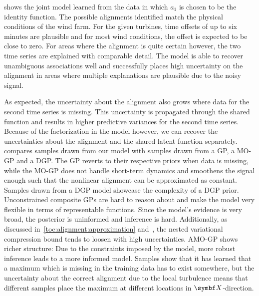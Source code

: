  shows the joint model learned from the data in which $a_1$ is chosen to be the identity function.
The possible alignments identified match the physical conditions of the wind farm.
For the given turbines, time offsets of up to six minutes are plausible and for most wind conditions, the offset is expected to be close to zero.
For areas where the alignment is quite certain however, the two time series are explained with comparable detail.
The model is able to recover unambiguous associations well and successfully places high uncertainty on the alignment in areas where multiple explanations are plausible due to the noisy signal.

As expected, the uncertainty about the alignment also grows where data for the second time series is missing.
This uncertainty is propagated through the shared function and results in higher predictive variances for the second time series.
Because of the factorization in the model however, we can recover the uncertainties about the alignment and the shared latent function separately.
 compares samples drawn from our model with samples drawn from a GP, a MO-GP and a DGP.
The GP reverts to their respective priors when data is missing, while the MO-GP does not handle short-term dynamics and smoothens the signal enough such that the nonlinear alignment can be approximated as constant.
Samples drawn from a DGP model showcase the complexity of a DGP prior.
Unconstrained composite GPs are hard to reason about and make the model very flexible in terms of representable functions.
Since the model's evidence is very broad, the posterior is uninformed and inference is hard.
Additionally, as discussed in~\cref{toc:alignment:approximation} and~\parencite{hensman_nested_2014}, the nested variational compression bound tends to loosen with high uncertainties.
AMO-GP shows richer structure:
Due to the constraints imposed by the model, more robust inference leads to a more informed model.
Samples show that it has learned that a maximum which is missing in the training data has to exist somewhere, but the uncertainty about the correct alignment due to the local turbulence means that different samples place the maximum at different locations in $\mat{X}$-direction.

